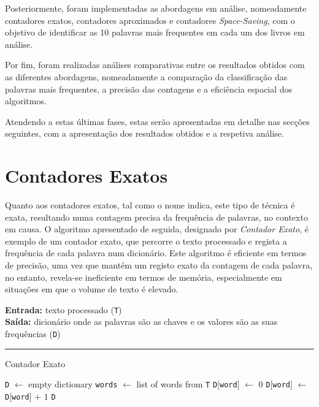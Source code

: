 \documentclass[mirror, portugues]{revdetua}
\begin{document}
Posteriormente, foram implementadas as abordagens em análise, nomeadamente contadores exatos, contadores aproximados e contadores \textit{Space-Saving}, com o objetivo de identificar as 10 palavras mais frequentes em cada um dos livros em análise.

Por fim, foram realizadas análises comparativas entre os resultados obtidos com as diferentes abordagens, nomeadamente a comparação da classificação das palavras mais frequentes, a precisão das contagens e a eficiência espacial dos algoritmos.

Atendendo a estas últimas fases, estas serão apresentadas em detalhe nas secções seguintes, com a apresentação dos resultados obtidos e a respetiva análise.

\section{Contadores Exatos}

Quanto aos contadores exatos, tal como o nome indica, este tipo de técnica é exata, resultando numa contagem precisa da frequência de palavras, no contexto em causa.
O algoritmo apresentado de seguida, designado por \textit{Contador Exato}, é exemplo de um contador exato, que percorre o texto processado e regista a frequência de cada palavra num dicionário. Este algoritmo é eficiente em termos de precisão, uma vez que mantém um registo exato da contagem de cada palavra, no entanto, revela-se ineficiente em termos de memória, especialmente em situações em que o volume de texto é elevado.

\begin{algorithm}[H]
\raggedright
\textbf{Entrada:} texto processado (\texttt{T}) \\
\textbf{Saída:} dicionário onde as palavras são as chaves e os valores são as suas frequências (\texttt{D})\\
\hrule 
\caption{Contador Exato}
\begin{algorithmic}[1]
    \State \texttt{D} $\gets$ empty dictionary
    \State \texttt{words} $\gets$ list of words from \texttt{T}
            \State \texttt{D}[\texttt{word}] $\gets$ 0
        \EndIf
        \State \texttt{D}[\texttt{word}] $\gets$ \texttt{D}[\texttt{word}] + $1$
    \EndFor
    \State \Return \texttt{D}
\end{algorithmic}
\end{algorithm}
\end{document}
